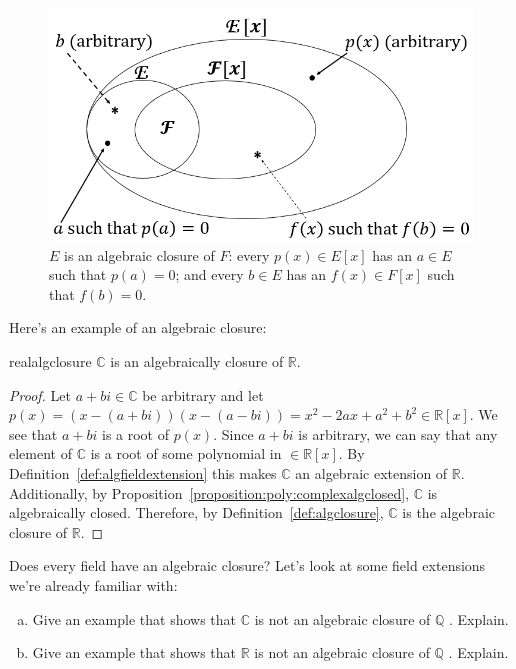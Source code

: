 \begin{figure}
\begin{center}
\includegraphics[scale=0.35]{images/algebraic_closure.png}
\caption{$E$ is an algebraic closure of $F$:  every $p(x)\in E[x]$ has an $a\in E$ such that $p(a)=0$; and every $b\in E$ has an $f(x)\in F[x]$ such that $f(b)=0$.}\label{algebraicclosure}
\end{center}
\end{figure}

Here's an example of an algebraic closure:

\begin{prop}{realalgclosure}
$\mathbb{C}$ is an algebraically closure of $\mathbb{R}$.
\end{prop}


\begin{proof}{}
Let $a+bi \in \mathbb{C}$ be arbitrary and let $p(x)=(x-(a+bi))(x-(a-bi))= x^2-2ax+a^2+b^2\in\mathbb{R}[x]$. We see that $a+bi$ is a root of $p(x)$. Since $a+bi$ is arbitrary, we can say that any element of $\mathbb{C}$ is a root of some polynomial in $\in\mathbb{R}[x]$. By Definition~\ref{def:algfieldextension} this makes $\mathbb{C}$ an algebraic extension of $\mathbb{R}$. Additionally, by Proposition~\ref{proposition:poly:complexalgclosed}, $\mathbb{C}$ is algebraically closed. Therefore, by Definition~\ref{def:algclosure}, $\mathbb{C}$ is the algebraic closure of $\mathbb{R}$.
\end{proof}

Does every field have an algebraic closure? Let's look at some field extensions we're already familiar with:

\begin{exercise}{}
\begin{enumerate}[(a)]
\item
Give an example that shows that $\mathbb{C}$ is not an algebraic closure of $\mathbb{Q}$ . Explain.
\item
Give an example that shows that $\mathbb{R}$ is not an algebraic closure of $\mathbb{Q}$ . Explain.
\end{enumerate}
\end{exercise}


